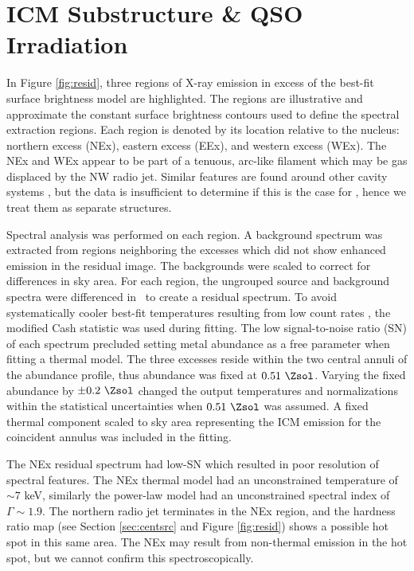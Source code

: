 \documentclass[useAMS,usenatbib]{mn2e}
\begin{document}
\section{ICM Substructure \& QSO Irradiation}
\label{sec:excess}

In Figure \ref{fig:resid}, three regions of X-ray emission in excess
of the best-fit surface brightness model are highlighted. The regions
are illustrative and approximate the constant surface brightness
contours used to define the spectral extraction regions. Each region
is denoted by its location relative to the nucleus: northern excess
(NEx), eastern excess (EEx), and western excess (WEx). The NEx and WEx
appear to be part of a tenuous, arc-like filament which may be gas
displaced by the NW radio jet. Similar features are found around other
cavity systems \citep[\eg][]{2009ApJ...697L..95B}, but the data is
insufficient to determine if this is the case for \irs, hence we treat
them as separate structures.

Spectral analysis was performed on each region. A background spectrum
was extracted from regions neighboring the excesses which did not show
enhanced emission in the residual image. The backgrounds were scaled
to correct for differences in sky area. For each region, the ungrouped
source and background spectra were differenced in \xspec\ to create a
residual spectrum. To avoid systematically cooler best-fit
temperatures resulting from low count rates
\citep{1989ApJ...342.1207N}, the modified Cash statistic
\citep{1979ApJ...228..939C} was used during fitting. The low
signal-to-noise ratio (SN) of each spectrum precluded setting metal
abundance as a free parameter when fitting a thermal model. The three
excesses reside within the two central annuli of the abundance
profile, thus abundance was fixed at $0.51 ~\Zsol$. Varying the fixed
abundance by $\pm 0.2 ~\Zsol$ changed the output temperatures and
normalizations within the statistical uncertainties when $0.51 ~\Zsol$
was assumed. A fixed thermal component scaled to sky area representing
the ICM emission for the coincident annulus was included in the
fitting.

The NEx residual spectrum had low-SN which resulted in poor resolution
of spectral features. The NEx thermal model had an unconstrained
temperature of $\sim 7$ keV, similarly the power-law model had an
unconstrained spectral index of $\Gamma \sim 1.9$. The northern radio
jet terminates in the NEx region, and the hardness ratio map (see
Section \ref{sec:centsrc} and Figure \ref{fig:resid}) shows a possible
hot spot in this same area. The NEx may result from non-thermal
emission in the hot spot, but we cannot confirm this
spectroscopically.
\end{document}

